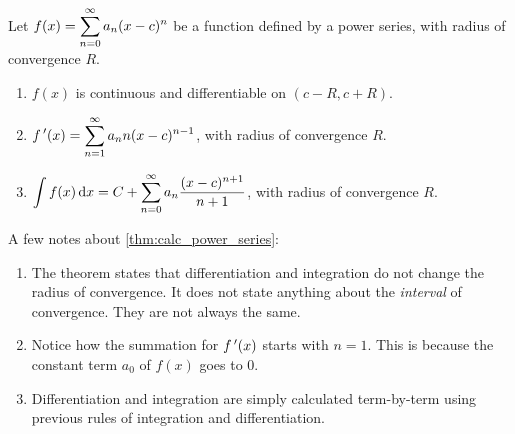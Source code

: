 \begin{theorem}\label{thm:calc_power_series}%
Let $\displaystyle f(x) = \sum_{n=0}^\infty a_n(x-c)^n$ be a function defined by a power series, with radius of convergence $R$.
\begin{enumerate}
	\item $f(x)$ is continuous and differentiable on $(c-R,c+R)$.
	\item	$\displaystyle f\,'(x) = \sum_{n=1}^\infty a_nn(x-c)^{n-1}$, with radius of convergence $R$.
	\item	$\displaystyle \int f(x)\operatorname{d}\! x = C+\sum_{n=0}^\infty a_n\frac{(x-c)^{n+1}}{n+1}$, with radius of convergence $R$.
\end{enumerate}
\end{theorem}

A few notes about \autoref{thm:calc_power_series}:
\begin{enumerate}
	\item The theorem states that differentiation and integration do not change the radius of convergence. It does not state anything about the \emph{interval} of convergence. They are not always the same.
	\item	Notice how the summation for $f\,'(x)$ starts with $n=1$. This is because the constant term $a_0$ of $f(x)$ goes to 0.
	\item	Differentiation and integration are simply calculated term-by-term using previous rules of integration and differentiation.
\end{enumerate}

